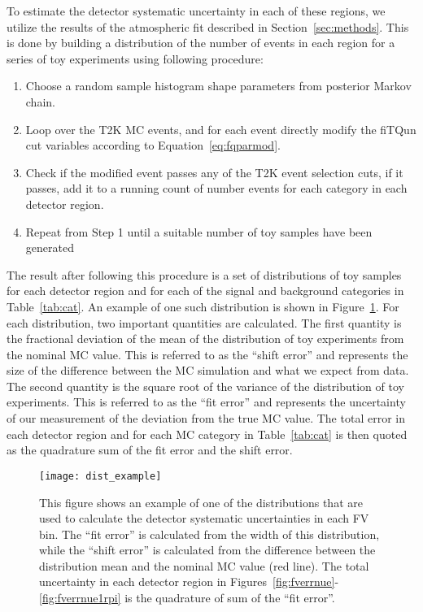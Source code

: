 To estimate the detector systematic uncertainty in each of these regions, we
utilize the results of the atmospheric fit described in
Section~\ref{sec:methods}. This is done by building a distribution of the
number of events in each region for a series of toy experiments using following
procedure:

\begin{enumerate}
  \item Choose a random sample histogram shape parameters from posterior Markov chain.
  \item Loop over the T2K MC events, and for each event directly modify the fiTQun cut variables
    according to Equation~\ref{eq:fqparmod}.
  \item Check if the modified event passes any of the T2K event selection cuts,
    if it passes, add it to a running
    count of number events for each category in each detector region.
  \item Repeat from Step 1 until a suitable number of toy samples have been generated
\end{enumerate}

The result after following this procedure is a set of distributions of toy
samples for each detector region and for each of the signal and background
categories in Table~\ref{tab:cat}.  An example of one such distribution is
shown in Figure~\ref{fig:fverrsinglebin}.  For each distribution, two important
quantities are calculated.  The first quantity is the fractional deviation of
the mean of the distribution of toy experiments from the nominal MC value.
This is referred to as the ``shift error'' and represents the size of the
difference between the MC simulation and what we expect from data.  The second
quantity is the square root of the variance of the distribution of toy
experiments.  This is referred to as the ``fit error'' and represents the
uncertainty of our measurement of the deviation from the true MC
value.  The total error in each detector region and for each MC category in
Table~\ref{tab:cat} is then quoted as the quadrature sum of the fit error and
the shift error. 

\begin{figure}[h]
  \begin{center}
    \texttt{[image: dist\_example]}
  \end{center}
  \caption{This figure shows an example of one of the distributions that are
  used to calculate the detector systematic uncertainties in each FV bin.  The
  ``fit error'' is calculated from the width of this distribution, while the
  ``shift error'' is calculated from the difference between the distribution
  mean and the nominal MC value (red line).  The total uncertainty in each
  detector region in Figures~\ref{fig:fverrnue}-\ref{fig:fverrnue1rpi} is the
  quadrature of sum of the ``fit error''.}
  \label{fig:fverrsinglebin}
\end{figure}

